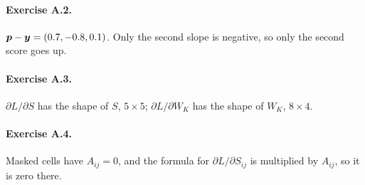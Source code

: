 \paragraph{Exercise A.2.} $\bm{p}-\bm{y}=(0.7, -0.8, 0.1)$. Only the second slope is negative, so only the second
score goes up.
\paragraph{Exercise A.3.} $\partial L/\partial S$ has the shape of $S$, $5\times5$; $\partial
L/\partial W_K$ has the shape of $W_K$, $8\times4$.
\paragraph{Exercise A.4.} Masked cells have $A_{ij}=0$, and the formula for $\partial L/\partial S_{ij}$ is
multiplied by $A_{ij}$, so it is zero there.
